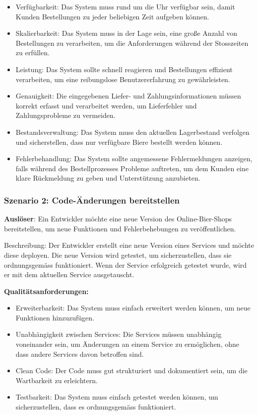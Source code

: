 \begin{itemize}
    \item Verfügbarkeit: Das System muss rund um die Uhr verfügbar sein, damit Kunden Bestellungen zu jeder beliebigen Zeit aufgeben können.
    \item Skalierbarkeit: Das System muss in der Lage sein, eine große Anzahl von Bestellungen zu verarbeiten, um die Anforderungen während der Stosszeiten zu erfüllen.
    \item Leistung: Das System sollte schnell reagieren und Bestellungen effizient verarbeiten, um eine reibungslose Benutzererfahrung zu gewährleisten.
    \item Genauigkeit: Die eingegebenen Liefer- und Zahlungsinformationen müssen korrekt erfasst und verarbeitet werden, um Lieferfehler und Zahlungsprobleme zu vermeiden.
    \item Bestandsverwaltung: Das System muss den aktuellen Lagerbestand verfolgen und sicherstellen, dass nur verfügbare Biere bestellt werden können.
    \item Fehlerbehandlung: Das System sollte angemessene Fehlermeldungen anzeigen, falls während des Bestellprozesses Probleme auftreten, um dem Kunden eine klare Rückmeldung zu geben und Unterstützung anzubieten.
\end{itemize}

\subsubsection{Szenario 2: Code-Änderungen bereitstellen}
\label{subsec:szenario2}

\textbf{Auslöser}: Ein Entwickler möchte eine neue Version des Online-Bier-Shops bereitstellen, um neue Funktionen und Fehlerbehebungen zu veröffentlichen.

Beschreibung: Der Entwickler erstellt eine neue Version eines Services und möchte diese deployen. Die neue Version wird getestet, um sicherzustellen, dass sie ordnungsgemäss funktioniert. Wenn der Service erfolgreich getestet wurde, wird er mit dem aktuellen Service ausgetauscht.

\textbf{Qualitätsanforderungen:}

\begin{itemize}
    \item Erweiterbarkeit: Das System muss einfach erweitert werden können, um neue Funktionen hinzuzufügen.
    \item Unabhängigkeit zwischen Services: Die Services müssen unabhängig voneinander sein, um Änderungen an einem Service zu ermöglichen, ohne dass andere Services davon betroffen sind.
    \item Clean Code: Der Code muss gut strukturiert und dokumentiert sein, um die Wartbarkeit zu erleichtern.
    \item Testbarkeit: Das System muss einfach getestet werden können, um sicherzustellen, dass es ordnungsgemäss funktioniert.
\end{itemize}